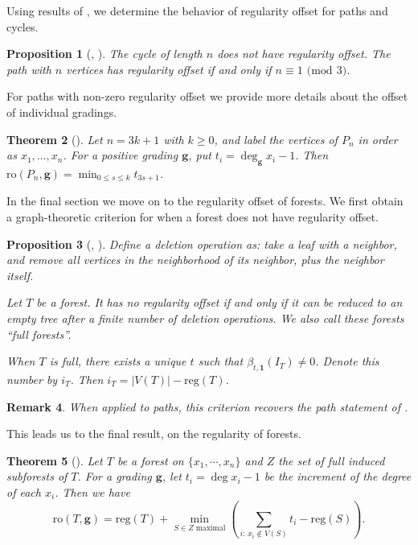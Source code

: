 \documentclass[dvipsnames,10pt]{article}
\newcommand{\reg}{\mathrm{reg}}
\newtheorem{theorem}{Theorem}[section]
\newtheorem{proposition}[theorem]{Proposition}
\newtheorem{remark}[theorem]{Remark}
\begin{document}
Using results of \cite{kozlov1999complexes}, we determine the behavior of regularity offset for paths and cycles.

\begin{proposition}[, ] 
    The cycle of length $n$ does not have regularity offset. The path with $n$ vertices has regularity offset if and only if $n\equiv 1$ $(\mathrm{mod}$ $3)$.
\end{proposition}
For paths with non-zero regularity offset we provide more details about the offset of individual gradings.
\begin{theorem}[] 
    Let $n=3k+1$ with $k\geq0$, and label the vertices of $P_n$ in order as $x_1,\ldots,x_n$. For a positive grading $\mathbf{g}$, put $t_i=\deg_{\mathbf{g}}x_i-1$. Then $\mathrm{ro}(P_n,\mathbf{g})=\min_{0\leq s\leq k}t_{3s+1}$.
\end{theorem}

In the final section we move on to the regularity offset of forests. We first obtain a graph-theoretic criterion for when a forest does not have regularity offset.

\begin{proposition}[, ]%
    Define a deletion operation as: take a leaf with a neighbor, and remove all vertices in the neighborhood of its neighbor, plus the neighbor itself.

    Let $T$ be a forest. It has no regularity offset if and only if it can be reduced to an empty tree after a finite number of deletion operations. We also call these forests ``full forests''.

    When $T$ is full, there exists a unique $t$ such that $\beta_{t,\mathbf{1}}(I_T)\neq 0$. Denote this number by $i_T$. Then $i_T=|V(T)|-\reg(T)$.
\end{proposition}

\begin{remark}
    When applied to paths, this criterion recovers the path statement of .
\end{remark}

This leads us to the final result, on the regularity of forests.

\begin{theorem}[]%
    Let $T$ be a forest on $\{x_1,\cdots,x_n\}$ and $Z$ the set of full induced subforests of $T$. For a grading $\mathbf{g}$, let $t_i=\deg x_i-1$ be the increment of the degree of each $x_i$. Then we have
    \begin{equation*}
        \mathrm{ro}(T,\mathbf{g}) = \mathrm{reg}(T) + \min_{S\in Z\;\text{maximal}}\left( \sum_{i:\,x_i\notin V(S)} t_i - \mathrm{reg}(S) \right).
    \end{equation*}
\end{theorem}
\end{document}
